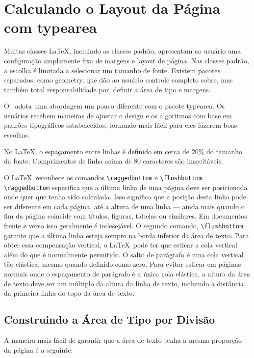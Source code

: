 \chapter{Calculando o Layout da Página com typearea}
Muitas classes \LaTeX, incluindo as classes padrão, apresentam ao usuário uma configuração amplamente fixa de margens e layout de página. Nas classes padrão, a escolha é limitada a selecionar um tamanho de fonte. Existem pacotes separados, como geometry, que dão ao usuário controle completo sobre, mas também total responsabilidade por, definir a área de tipo e margens.

O \KOMAScript\ adota uma abordagem um pouco diferente com o pacote typearea. Os usuários recebem maneiras de ajustar o design e os algoritmos com base em padrões tipográficos estabelecidos, tornando mais fácil para eles fazerem boas escolhas.

No LaTeX, o espaçamento entre linhas é definido em cerca de 20\% do tamanho da fonte.
Comprimentos de linha acima de 80 caracteres são inaceitáveis.

O \LaTeX\ reconhece os comandos \verb|\raggedbottom| e \verb|\flushbottom|. \verb|\raggedbottom| especifica que a última linha de uma página deve ser posicionada onde quer que tenha sido calculada. Isso significa que a posição desta linha pode ser diferente em cada página, até a altura de uma linha — ainda mais quando o fim da página coincide com títulos, figuras, tabelas ou similares. Em documentos frente e verso isso geralmente é indesejável. O segundo comando, \verb|\flushbottom|, garante que a última linha esteja sempre na borda inferior da área de texto. Para obter essa compensação vertical, o  \LaTeX\ pode ter que esticar a cola vertical além do que é normalmente permitido. O salto de parágrafo é uma cola vertical tão elástica, mesmo quando definido como zero. Para evitar esticar em páginas normais onde o espaçamento de parágrafo é a única cola elástica, a altura da área de texto deve ser um múltiplo da altura da linha de texto, incluindo a distância da primeira linha do topo da área de texto.

\section{Construindo a Área de Tipo por Divisão}
A maneira mais fácil de garantir que a área de texto tenha a mesma proporção da página é a seguinte:

